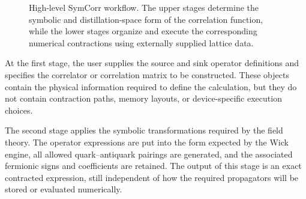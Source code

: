 \documentclass[11pt]{article}
\begin{document}
\begin{figure}[t]
\centering
{}
\caption{High-level SymCorr workflow. The upper stages determine the symbolic
and distillation-space form of the correlation function, while the lower stages
organize and execute the corresponding numerical contractions using externally
supplied lattice data.}
\label{fig:symcorr_workflow}
\end{figure}

At the first stage, the user supplies the source and sink operator definitions
and specifies the correlator or correlation matrix to be constructed. These
objects contain the physical information required to define the calculation,
but they do not contain contraction paths, memory layouts, or device-specific
execution choices.

The second stage applies the symbolic transformations required by the field
theory. The operator expressions are put into the form expected by the Wick
engine, all allowed quark--antiquark pairings are generated, and the associated
fermionic signs and coefficients are retained. The output of this stage is an
exact contracted expression, still independent of how the required propagators
will be stored or evaluated numerically.
\end{document}
